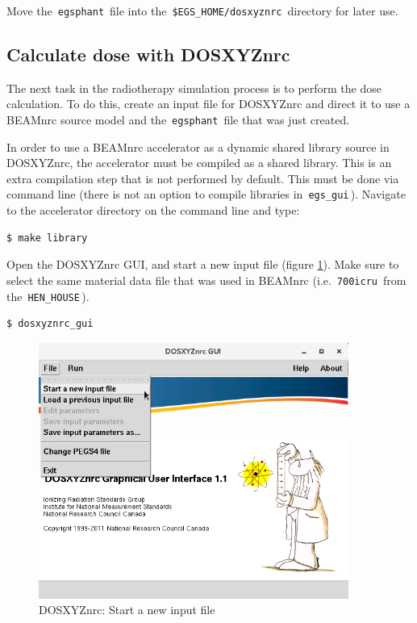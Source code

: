 \documentclass[12pt,twoside]{article}
\begin{document}
Move the \,\Verb|egsphant|\, file into the \,\Verb|$EGS_HOME/dosxyznrc|\, directory for later use.

\clearpage
\subsection{Calculate dose with DOSXYZnrc}
The next task in the radiotherapy simulation process is to perform the dose calculation. To do this, create an input file for DOSXYZnrc and direct it to use a BEAMnrc source model and the \,\Verb|egsphant|\, file that was just created.

In order to use a BEAMnrc accelerator as a dynamic shared library source in DOSXYZnrc, the accelerator must be compiled as a shared library. This is an extra compilation step that is not performed by default. This must be done via command line (there is not an option to compile libraries in \,\Verb|egs_gui|\,). Navigate to the accelerator directory on the command line and type:

\begin{lstlisting}
$ make library
\end{lstlisting}

Open the DOSXYZnrc GUI, and start a new input file (figure \ref{fig:dosxyz_step1}). Make sure to select the same material data file that was used in BEAMnrc (i.e. \,\Verb|700icru|\, from the \,\Verb|HEN_HOUSE|\,).

\begin{lstlisting}
$ dosxyznrc_gui
\end{lstlisting}

\begin{figure}
\begin{center}
\includegraphics[width=4in]{figures/dosxyz_step1}
\caption{DOSXYZnrc: Start a new input file}
\label{fig:dosxyz_step1}
\end{center}
\end{figure}
\end{document}
